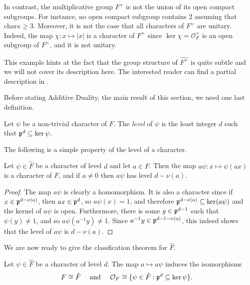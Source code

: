 \begin{example}
    In contrast, the multiplicative group $F^\times$ is not the union of its open compact subgroups. For instance, no open compact subgroup contains $2$ assuming that $\mathrm{char}\kappa\geq 3$. Moreover, it is not the case that all characters of $F^\times$ are unitary. Indeed, the map $\chi:x\mapsto|x|$ is a character of $F^{\times}$ since $\ker\chi=\mathcal{O}_F^\times$ is an open subgroup of $F^\times$, and it is not unitary.

    This example hints at the fact that the group structure of $\hat{F^\times}$ is quite subtle and we will not cover its description here. The interested reader can find a partial description in \cite[\S 1.8]{BH1}.
\end{example}


Before stating Additive Duality, the main result of this section, we need one last definition.

\begin{defn}\label{def:addlevel}
    Let $\psi$ be a non-trivial character of $F$. The \textit{level} of $\psi$ is the least integer $d$ such that $\mathfrak{p}^d\subseteq\ker\psi$.
\end{defn}

The following is a simple property of the level of a character.

\begin{lemma}
    Let $\psi\in\hat{F}$ be a character of level $d$ and let $a\in F$. Then the map $a\psi:x\mapsto\psi(ax)$ is a character of $F$, and if $a\neq0$ then $a\psi$ has level $d-\nu(a)$.
\end{lemma}
\begin{proof}
    The map $a\psi$ is clearly a homomorphism. It is also a character since if $x\in\mathfrak{p}^{d-\nu(a)}$, then $ax\in\mathfrak{p}^d$, so $a\psi(x)=1$, and therefore $\mathfrak{p}^{d-\nu(a)}\subseteq\ker(a\psi)$ and the kernel of $a\psi$ is open. Furthermore, there is some $y\in\mathfrak{p}^{d-1}$ such that $\psi(y)\neq1$, and so $a\psi(a^{-1}y)\neq1$. Since $a^{-1}y\in\mathfrak{p}^{d-1-\nu(a)}$, this indeed shows that the level of $a\psi$ is $d-\nu(a)$. 
\end{proof}

We are now ready to give the classfication theorem for $\hat{F}$.

\begin{thm}\label{add_dual}
    Let $\psi\in\hat{F}$ be a character of level $d$. The map $a\mapsto a\psi$ induces the isomorphisms 
    $$F\cong\hat{F} \quad\text{ and }\quad \mathcal{O}_F\cong\{\psi\in\hat{F}:\mathfrak{p}^d\subseteq\ker\psi\}.$$  
\end{thm}

